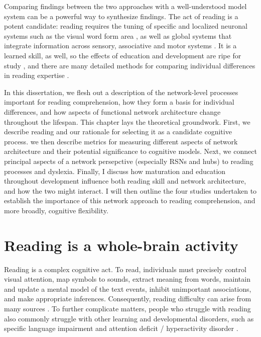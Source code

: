Comparing findings between the two approaches with a well-understood model system can be a powerful way to synthesize findings. The act of reading is a potent candidate: reading requires the tuning of specific and localized neuronal systems such as the visual word form area \citep{McCandliss2003}, as well as global systems that integrate information across sensory, associative and motor systems \citep{Price2012}. It is a learned skill, as well, so the effects of education and development are ripe for study \citep{Saygin2016}, and there are many detailed methods for comparing individual differences in reading expertise \citep{Woodcock1998}. 

In this dissertation, we flesh out a description of the network-level processes important for reading comprehension, how they form a basis for individual differences, and how aspects of functional network architecture change throughout the lifespan. This chapter lays the theoretical groundwork. First, we describe reading and our rationale for selecting it as a candidate cognitive process. we then describe metrics for measuring different aspects of network architecture and their potential significance to cognitive models. Next, we connect principal aspects of a network persepctive (especially RSNs and hubs) to reading processes and dyslexia. Finally, I discuss how maturation and education throughout development influence both reading skill and network architecture, and how the two might interact. I will then outline the four studies undertaken to establish the importance of this network approach to reading comprehension, and more broadly, cognitive flexibility.

\section{Reading is a whole-brain activity}

Reading is a complex cognitive act. To read, individuals must precisely control visual attention, map symbols to sounds, extract meaning from words, maintain and update a mental model of the text events, inhibit unimportant associations, and make appropriate inferences. Consequently, reading difficulty can arise from many sources \citep{Pennington2009, vanderLely2010}. To further complicate matters, people who struggle with reading also commonly struggle with other learning and developmental disorders, such as specific language impairment and attention deficit / hyperactivity disorder \citep{Pennington2006, Margari2013}.

